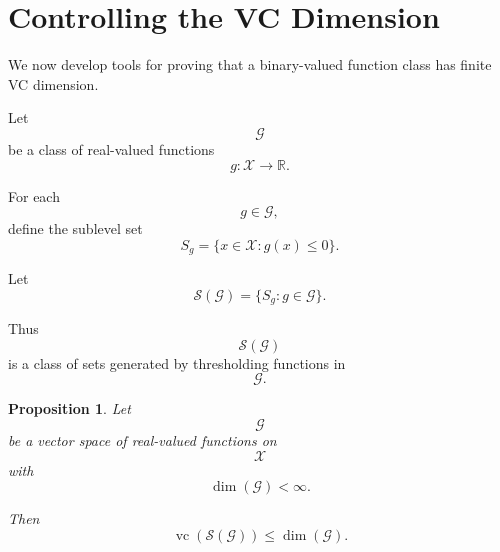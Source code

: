 \documentclass[12pt,oneside]{book}
\numberwithin{equation}{section}
\theoremstyle{definition}
\theoremstyle{plain}
\newtheorem{proposition}{Proposition}[section]
\theoremstyle{remark}
\newcommand{\R}{\mathbb{R}}
\begin{document}
\section{Controlling the VC Dimension}

We now develop tools for proving that a binary-valued function class has finite VC dimension.

Let
\[
\mathcal{G}
\]
be a class of real-valued functions
\[
g:\mathcal{X}\to\R.
\]

For each
\[
g\in\mathcal{G},
\]
define the sublevel set
\[
S_g
=
\{x\in\mathcal{X}:g(x)\leq0\}.
\]

Let
\[
\mathcal{S}(\mathcal{G})
=
\{S_g:g\in\mathcal{G}\}.
\]

Thus
\[
\mathcal{S}(\mathcal{G})
\]
is a class of sets generated by thresholding functions in
\[
\mathcal{G}.
\]

\begin{proposition}
Let
\[
\mathcal{G}
\]
be a vector space of real-valued functions on
\[
\mathcal{X}
\]
with
\[
\dim(\mathcal{G})<\infty.
\]

Then
\[
\operatorname{vc}(\mathcal{S}(\mathcal{G}))
\leq
\dim(\mathcal{G}).
\]
\end{proposition}
\end{document}
